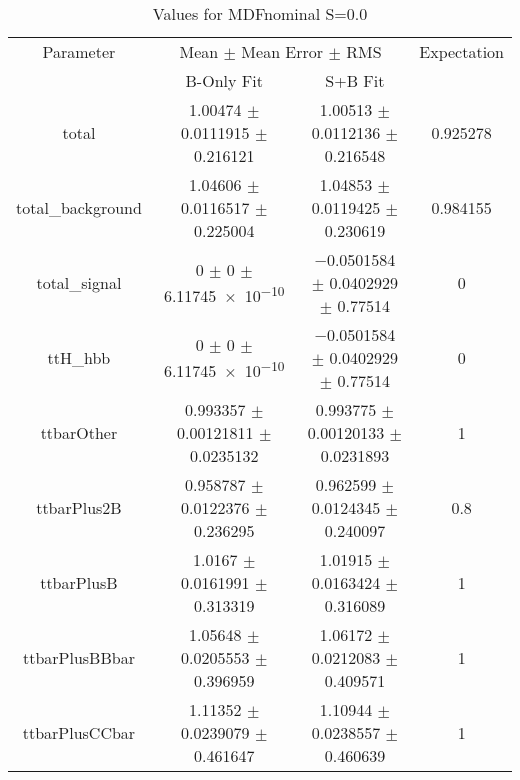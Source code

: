 \begin{table}
\centering
\caption{Values for MDFnominal S=0.0}
\begin{tabular}{cccc}
\toprule
Parameter & \multicolumn{2}{c}{Mean $\pm$ Mean Error $\pm$ RMS} & Expectation\\
 & B-Only Fit & S+B Fit & \\
\midrule
total & \num{1.00474} $\pm$ \num{0.0111915} $\pm$ \num{0.216121} & \num{1.00513} $\pm$ \num{0.0112136} $\pm$ \num{0.216548} & \num{0.925278}\\
total\_background & \num{1.04606} $\pm$ \num{0.0116517} $\pm$ \num{0.225004} & \num{1.04853} $\pm$ \num{0.0119425} $\pm$ \num{0.230619} & \num{0.984155}\\
total\_signal & \num{0} $\pm$ \num{0} $\pm$ \num{6.11745e-10} & \num{-0.0501584} $\pm$ \num{0.0402929} $\pm$ \num{0.77514} & \num{0}\\
ttH\_hbb & \num{0} $\pm$ \num{0} $\pm$ \num{6.11745e-10} & \num{-0.0501584} $\pm$ \num{0.0402929} $\pm$ \num{0.77514} & \num{0}\\
ttbarOther & \num{0.993357} $\pm$ \num{0.00121811} $\pm$ \num{0.0235132} & \num{0.993775} $\pm$ \num{0.00120133} $\pm$ \num{0.0231893} & \num{1}\\
ttbarPlus2B & \num{0.958787} $\pm$ \num{0.0122376} $\pm$ \num{0.236295} & \num{0.962599} $\pm$ \num{0.0124345} $\pm$ \num{0.240097} & \num{0.8}\\
ttbarPlusB & \num{1.0167} $\pm$ \num{0.0161991} $\pm$ \num{0.313319} & \num{1.01915} $\pm$ \num{0.0163424} $\pm$ \num{0.316089} & \num{1}\\
ttbarPlusBBbar & \num{1.05648} $\pm$ \num{0.0205553} $\pm$ \num{0.396959} & \num{1.06172} $\pm$ \num{0.0212083} $\pm$ \num{0.409571} & \num{1}\\
ttbarPlusCCbar & \num{1.11352} $\pm$ \num{0.0239079} $\pm$ \num{0.461647} & \num{1.10944} $\pm$ \num{0.0238557} $\pm$ \num{0.460639} & \num{1}\\
\bottomrule
\end{tabular}
\end{table}